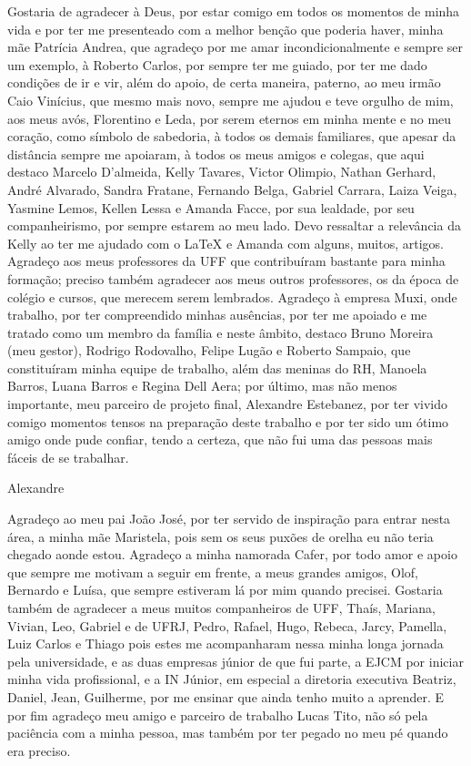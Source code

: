 \documentclass[a4paper,oneside,12pt]{book}
\begin{document}
Gostaria de agradecer à Deus, por estar comigo em todos os momentos de minha 
vida e por ter me presenteado com a melhor benção que poderia haver, minha mãe Patrícia 
Andrea, que agradeço por me amar incondicionalmente e sempre ser um exemplo, à Roberto 
Carlos, por sempre ter me guiado, por ter me dado condições de ir e vir, além do apoio, de 
certa maneira, paterno, ao meu irmão Caio Vinícius, que mesmo mais novo, sempre me ajudou e 
teve orgulho de mim, aos meus avós, Florentino e Leda, por serem eternos em minha mente e 
no meu coração, como símbolo de sabedoria, à todos os demais familiares, que apesar da 
distância sempre me apoiaram, à todos os meus amigos e colegas, que aqui destaco Marcelo 
D'almeida, Kelly Tavares, Victor Olimpio, Nathan Gerhard, André Alvarado, Sandra Fratane, 
Fernando Belga, Gabriel Carrara, Laiza Veiga, Yasmine Lemos, Kellen Lessa e  Amanda Facce, 
por sua lealdade, por seu companheirismo, por sempre estarem ao meu lado. Devo ressaltar a 
relevância da Kelly ao ter me ajudado com o LaTeX e Amanda com alguns, muitos,
artigos. Agradeço aos meus professores da UFF que contribuíram bastante para
minha formação; preciso também agradecer aos meus outros professores, os da época de colégio e cursos, que merecem serem lembrados. Agradeço à empresa Muxi, onde trabalho, por 
ter compreendido minhas ausências, por ter me apoiado e me tratado como um membro da 
família e neste âmbito, destaco Bruno Moreira (meu gestor), Rodrigo Rodovalho, Felipe Lugão 
e Roberto Sampaio, que constituíram minha equipe de trabalho, além das meninas do RH, 
Manoela Barros, Luana Barros e Regina Dell Aera; por último, mas não menos importante, meu 
parceiro de projeto final, Alexandre Estebanez, por ter vivido comigo momentos tensos na 
preparação deste trabalho e por ter sido um ótimo amigo onde pude confiar, tendo a certeza, 
que não fui uma das pessoas mais fáceis de se trabalhar.


\clearpage

Alexandre

Agradeço ao meu pai João José, por ter servido de inspiração para entrar nesta área, a minha mãe Maristela, pois sem os seus puxões de orelha eu não
teria chegado aonde estou. Agradeço a minha namorada Cafer, por todo amor e
apoio que sempre me motivam a seguir em frente, a meus grandes amigos, Olof,
Bernardo e Luísa, que sempre estiveram lá por mim quando precisei. Gostaria
também de agradecer a meus muitos companheiros de UFF, Thaís, Mariana, Vivian,
Leo, Gabriel e de UFRJ, Pedro, Rafael, Hugo, Rebeca, Jarcy, Pamella, Luiz Carlos
e Thiago pois estes me acompanharam nessa minha longa jornada pela universidade, e as duas empresas júnior de que fui parte, 
a EJCM por iniciar minha vida profissional, e a IN Júnior, em especial a diretoria executiva Beatriz, Daniel, Jean, Guilherme, 
por me ensinar que ainda tenho muito a aprender. E por fim agradeço meu amigo e parceiro de trabalho Lucas Tito, não só pela paciência com a minha pessoa, 
mas também por ter pegado no meu pé quando era preciso.
\end{document}
